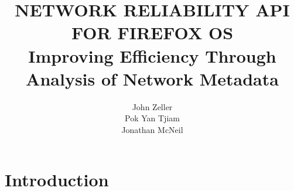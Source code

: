 \documentclass[12pt]{article}
\begin{document}
\title{NETWORK RELIABILITY API FOR FIREFOX OS\\Improving Efficiency Through Analysis of Network Metadata}
\maketitle
\begin{center}
    \author{John Zeller\\Pok Yan Tjiam\\Jonathan McNeil}
\end{center}
\pagebreak

\tableofcontents
\pagebreak

\section{Introduction}
\end{document}
